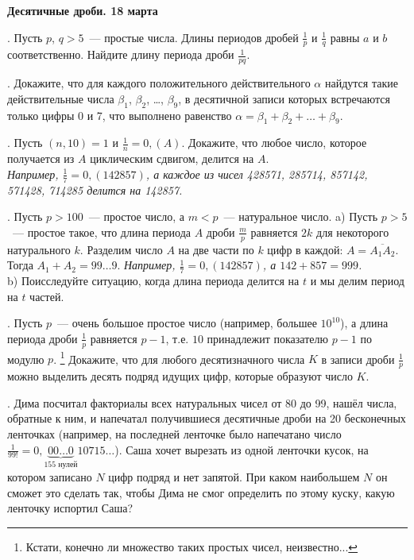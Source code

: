 \centerline{\bf Десятичные дроби. 18 марта}

. Пусть $p$, $q>5$~--- простые числа. Длины периодов дробей $\frac{1}{p}$ и $\frac{1}{q}$ равны $a$ и $b$ соответственно.
Найдите длину периода дроби $\frac{1}{pq}$. 

. Докажите, что для каждого положительного действительного $\alpha$ найдутся такие
действительные числа $\beta_1$, $\beta_2$, \ldots, $\beta_9$, в десятичной записи которых встречаются только цифры 0 и 7,
что выполнено равенство $\alpha=\beta_1+\beta_2+\ldots+\beta_9$.

. Пусть $(n,10)=1$ и $\frac{1}{n}=0,(A)$. Докажите, что любое число, которое
получается из $A$ циклическим сдвигом, делится на $A$. \\{\it Например, $\frac{1}{7}=0{,}(142857)$,
а каждое из чисел 428571, 285714, 857142, 571428, 714285 делится на 142857.}

. Пусть $p>100$~--- простое число, а $m<p$~--- натуральное число.
a) Пусть $p>5$~--- простое такое, что длина периода $A$ дроби $\frac{m}{p}$ равняется $2k$ для некоторого натурального $k$.
Разделим число $A$ на две части по $k$ цифр в каждой: $A=\overline{A_1A_2}$.
Тогда $A_1+A_2=99\ldots 9$. {\it Например, $\frac{1}{7}=0{,}(142857)$, а $142+857=999$.} \\
b) Поисследуйте ситуацию, когда длина периода делится на $t$ и мы делим
период на $t$ частей. 

. Пусть $p$~--- очень большое простое число (например, большее $10^{10}$), а длина
периода дроби $\frac{1}{p}$ равняется $p-1$, т.е. $10$ принадлежит показателю $p-1$ по модулю $p$.
\footnote{Кстати, конечно ли множество таких простых чисел, неизвестно...}
Докажите, что для любого десятизначного числа $K$ в записи дроби $\frac{1}{p}$
можно выделить десять подряд идущих цифр, которые образуют число $K$.

. Дима посчитал факториалы всех натуральных чисел от 80 до 99,
нашёл числа, обратные к ним, и напечатал получившиеся десятичные
дроби на 20 бесконечных ленточках (например,
на последней ленточке было напечатано число 
$\frac{1}{99!}=0{,}\underbrace{00\ldots 0}_\text{155 нулей}10715\ldots$).
Саша хочет вырезать из одной ленточки кусок, на котором записано $N$
цифр подряд и нет запятой. При каком наибольшем $N$ он сможет это
сделать так, чтобы Дима не смог определить по этому куску,
какую ленточку испортил Саша?
